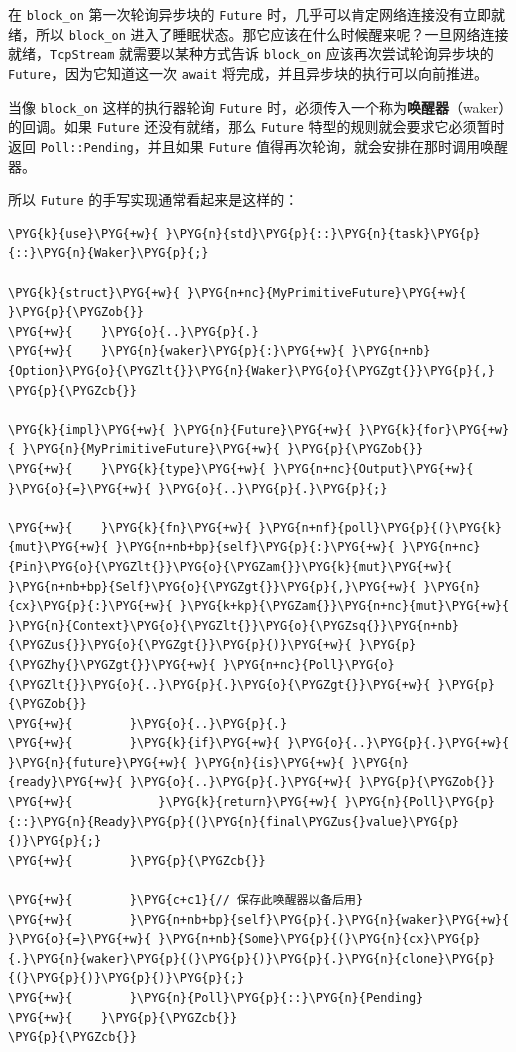 在 \texttt{block\_on} 第一次轮询异步块的 \texttt{Future} 时，几乎可以肯定网络连接没有立即就绪，所以 \texttt{block\_on} 进入了睡眠状态。那它应该在什么时候醒来呢？一旦网络连接就绪，\texttt{TcpStream} 就需要以某种方式告诉 \texttt{block\_on} 应该再次尝试轮询异步块的 \texttt{Future}，因为它知道这一次 \texttt{await} 将完成，并且异步块的执行可以向前推进。

当像 \texttt{block\_on} 这样的执行器轮询 \texttt{Future} 时，必须传入一个称为\textbf{唤醒器}（waker）的回调。如果 \texttt{Future} 还没有就绪，那么 \texttt{Future} 特型的规则就会要求它必须暂时返回 \texttt{Poll::Pending}，并且如果 \texttt{Future} 值得再次轮询，就会安排在那时调用唤醒器。

所以 \texttt{Future} 的手写实现通常看起来是这样的：

\begin{Verbatim}[commandchars=\\\{\},breaklines=true,breakanywhere=true,fontsize=\codefont,xleftmargin=17bp]
\PYG{k}{use}\PYG{+w}{ }\PYG{n}{std}\PYG{p}{::}\PYG{n}{task}\PYG{p}{::}\PYG{n}{Waker}\PYG{p}{;}

\PYG{k}{struct}\PYG{+w}{ }\PYG{n+nc}{MyPrimitiveFuture}\PYG{+w}{ }\PYG{p}{\PYGZob{}}
\PYG{+w}{    }\PYG{o}{..}\PYG{p}{.}
\PYG{+w}{    }\PYG{n}{waker}\PYG{p}{:}\PYG{+w}{ }\PYG{n+nb}{Option}\PYG{o}{\PYGZlt{}}\PYG{n}{Waker}\PYG{o}{\PYGZgt{}}\PYG{p}{,}
\PYG{p}{\PYGZcb{}}

\PYG{k}{impl}\PYG{+w}{ }\PYG{n}{Future}\PYG{+w}{ }\PYG{k}{for}\PYG{+w}{ }\PYG{n}{MyPrimitiveFuture}\PYG{+w}{ }\PYG{p}{\PYGZob{}}
\PYG{+w}{    }\PYG{k}{type}\PYG{+w}{ }\PYG{n+nc}{Output}\PYG{+w}{ }\PYG{o}{=}\PYG{+w}{ }\PYG{o}{..}\PYG{p}{.}\PYG{p}{;}

\PYG{+w}{    }\PYG{k}{fn}\PYG{+w}{ }\PYG{n+nf}{poll}\PYG{p}{(}\PYG{k}{mut}\PYG{+w}{ }\PYG{n+nb+bp}{self}\PYG{p}{:}\PYG{+w}{ }\PYG{n+nc}{Pin}\PYG{o}{\PYGZlt{}}\PYG{o}{\PYGZam{}}\PYG{k}{mut}\PYG{+w}{ }\PYG{n+nb+bp}{Self}\PYG{o}{\PYGZgt{}}\PYG{p}{,}\PYG{+w}{ }\PYG{n}{cx}\PYG{p}{:}\PYG{+w}{ }\PYG{k+kp}{\PYGZam{}}\PYG{n+nc}{mut}\PYG{+w}{ }\PYG{n}{Context}\PYG{o}{\PYGZlt{}}\PYG{o}{\PYGZsq{}}\PYG{n+nb}{\PYGZus{}}\PYG{o}{\PYGZgt{}}\PYG{p}{)}\PYG{+w}{ }\PYG{p}{\PYGZhy{}\PYGZgt{}}\PYG{+w}{ }\PYG{n+nc}{Poll}\PYG{o}{\PYGZlt{}}\PYG{o}{..}\PYG{p}{.}\PYG{o}{\PYGZgt{}}\PYG{+w}{ }\PYG{p}{\PYGZob{}}
\PYG{+w}{        }\PYG{o}{..}\PYG{p}{.}
\PYG{+w}{        }\PYG{k}{if}\PYG{+w}{ }\PYG{o}{..}\PYG{p}{.}\PYG{+w}{ }\PYG{n}{future}\PYG{+w}{ }\PYG{n}{is}\PYG{+w}{ }\PYG{n}{ready}\PYG{+w}{ }\PYG{o}{..}\PYG{p}{.}\PYG{+w}{ }\PYG{p}{\PYGZob{}}
\PYG{+w}{            }\PYG{k}{return}\PYG{+w}{ }\PYG{n}{Poll}\PYG{p}{::}\PYG{n}{Ready}\PYG{p}{(}\PYG{n}{final\PYGZus{}value}\PYG{p}{)}\PYG{p}{;}
\PYG{+w}{        }\PYG{p}{\PYGZcb{}}

\PYG{+w}{        }\PYG{c+c1}{// 保存此唤醒器以备后用}
\PYG{+w}{        }\PYG{n+nb+bp}{self}\PYG{p}{.}\PYG{n}{waker}\PYG{+w}{ }\PYG{o}{=}\PYG{+w}{ }\PYG{n+nb}{Some}\PYG{p}{(}\PYG{n}{cx}\PYG{p}{.}\PYG{n}{waker}\PYG{p}{(}\PYG{p}{)}\PYG{p}{.}\PYG{n}{clone}\PYG{p}{(}\PYG{p}{)}\PYG{p}{)}\PYG{p}{;}
\PYG{+w}{        }\PYG{n}{Poll}\PYG{p}{::}\PYG{n}{Pending}
\PYG{+w}{    }\PYG{p}{\PYGZcb{}}
\PYG{p}{\PYGZcb{}}
\end{Verbatim}

